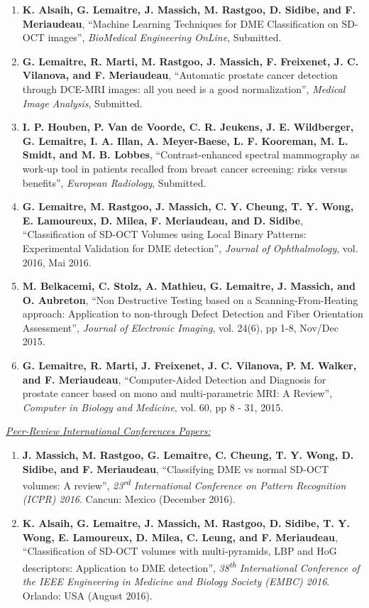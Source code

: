 {\begin{enumerate}
\item \textbf{K. Alsaih, G. Lemaitre, J. Massich, M. Rastgoo, D. Sidibe, and F. Meriaudeau}, ``Machine Learning Techniques for DME Classification on SD-OCT images'', \textit{BioMedical Engineering OnLine}, Submitted.
\item \textbf{G. Lemaitre, R. Marti, M. Rastgoo, J. Massich, F. Freixenet, J. C. Vilanova, and F. Meriaudeau}, ``Automatic prostate cancer detection through DCE-MRI images: all you need is a good normalization'', \textit{Medical Image Analysis}, Submitted.
\item \textbf{I. P. Houben, P. Van de Voorde, C. R. Jeukens, J. E. Wildberger, G. Lemaitre, I. A. Illan, A. Meyer-Baese, L. F. Kooreman, M. L. Smidt, and M. B. Lobbes}, ``Contrast-enhanced spectral mammography as work-up tool in patients recalled from breast cancer screening: risks versus benefits'', \textit{European Radiology}, Submitted.
\item \textbf{G. Lemaitre, M. Rastgoo, J. Massich, C. Y. Cheung, T. Y. Wong, E. Lamoureux, D. Milea, F. Meriaudeau, and D. Sidibe}, ``Classification of SD-OCT Volumes using Local Binary Patterns: Experimental Validation for DME detection'', \textit{Journal of Ophthalmology}, vol. 2016, Mai 2016.
\item \textbf{M. Belkacemi, C. Stolz, A. Mathieu, G. Lemaitre, J. Massich, and O. Aubreton}, ``Non Destructive Testing based on a Scanning-From-Heating approach: Application to non-through Defect Detection and Fiber Orientation Assessment'', \textit{Journal of Electronic Imaging}, vol. 24(6), pp 1-8, Nov/Dec 2015.
\item \textbf{G. Lemaitre, R. Marti, J. Freixenet, J. C. Vilanova, P. M. Walker, and F. Meriaudeau}, ``Computer-Aided Detection and Diagnosis for prostate cancer based on mono and multi-parametric MRI: A Review'', \textit{Computer in Biology and Medicine}, vol. 60, pp 8 - 31, 2015.
\end{enumerate}

\underline{\textit{Peer-Review International Conferences Papers:}}

\begin{enumerate}
\item \textbf{J. Massich, M. Rastgoo, G. Lemaitre, C. Cheung, T. Y. Wong, D. Sidibe, and F. Meriaudeau}, ``Classifying DME vs normal SD-OCT volumes: A review'', \textit{23\textsuperscript{rd} International Conference on Pattern Recognition (ICPR) 2016}. Cancun: Mexico (December 2016).

\item \textbf{K. Alsaih, G. Lemaitre, J. Massich, M. Rastgoo, D. Sidibe, T. Y. Wong, E. Lamoureux, D. Milea, C. Leung, and F. Meriaudeau}, ``Classification of SD-OCT volumes with multi-pyramids, LBP and HoG descriptors: Application to DME detection'', \textit{38\textsuperscript{th} International Conference of the IEEE Engineering in Medicine and Biology Society (EMBC) 2016}. Orlando: USA (August 2016).


\end{enumerate}}
